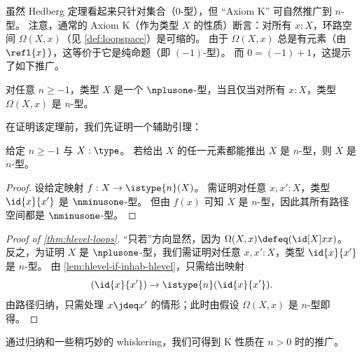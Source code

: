 %

%
虽然 Hedberg 定理看起来只针对集合（$0$-型），但 ``Axiom K'' 可自然推广到 $n$-型。
注意，通常的 Axiom K（作为类型 $X$ 的性质）断言：对所有 $x:X$，环路空间 $\Omega(X,x)$（见 \cref{def:loopspace}）是可缩的。
由于 $\Omega(X,x)$ 总是有元素（由 $\refl{x}$），这等价于它是纯命题（即 $(-1)$-型）。
而 $0 = (-1)+1$，这提示了如下推广。

\begin{thm}\label{thm:hlevel-loops}
  对任意 $n\geq -1$，类型 $X$ 是一个 $\nplusone$-型，当且仅当对所有 $x : X$，类型 $\Omega(X, x)$ 是 $n$-型。
\end{thm}

在证明该定理前，我们先证明一个辅助引理：

\begin{lem}\label{lem:hlevel-if-inhab-hlevel}
  给定 $n \geq -1$ 与 $X : \type$。
  若给出 $X$ 的任一元素都能推出 $X$ 是 $n$-型，则 $X$ 是 $n$-型。
\end{lem}
\begin{proof}
  设给定映射 $f : X \to \istype{n}(X)$。
  需证明对任意 $x, x' : X$，类型 $\id{x}{x'}$ 是 $\nminusone$-型。
  但由 $f(x)$ 可知 $X$ 是 $n$-型，因此其所有路径空间都是 $\nminusone$-型。
\end{proof}

\begin{proof}[Proof of \cref{thm:hlevel-loops}]
  “只若”方向显然，因为 $\Omega(X,x)\defeq (\id[X]xx)$。
  反之，为证明 $X$ 是 $\nplusone$-型，我们需证明对任意 $x, x' : X$，类型 $\id{x}{x'}$ 是
$n$-型。
  由 \cref{lem:hlevel-if-inhab-hlevel}，只需给出映射
  \[ (\id{x}{x'}) \to \istype{n}(\id{x}{x'}). \]
  由路径归纳，只需处理 $x\jdeq x'$ 的情形；此时由假设 $\Omega(X, x)$ 是
$n$-型即得。
\end{proof}

通过归纳和一些稍巧妙的 whiskering，我们可得到 K 性质在 $n>0$ 时的推广。

